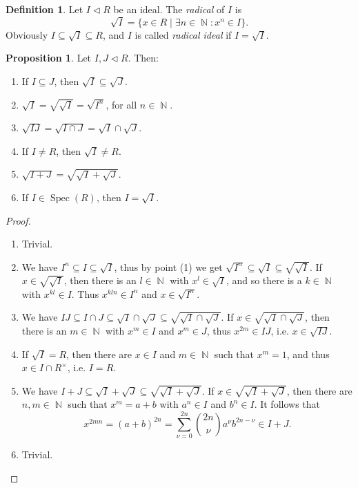 \documentclass[12pt,a4paper]{report}
\theoremstyle{definition}
\newtheorem{proposition}[theorem]{Proposition}
\newtheorem{defn}[theorem]{Definition}
\theoremstyle{num.custom-title}
\DeclareMathOperator{\N}{\mathbb{N}}
\DeclareMathOperator{\sse}{\subseteq}
\DeclareMathOperator{\Spec}{Spec}
\begin{document}
\begin{defn}
Let $I \lhd R$ be an ideal. The \emph{radical} of $I$ is
\[
\sqrt{I} = \{ x \in R \mid \exists n \in \N \colon x^n \in I \}.
\]
Obviously $I \sse \sqrt{I} \sse R$, and $I$ is called \emph{radical ideal} if $I=\sqrt{I}$.
\end{defn}

\begin{proposition}
Let $I,J \lhd R$. Then:
\begin{enumerate}
\item If $I \sse J$, then $\sqrt{I} \sse \sqrt{J}$.
\item $\sqrt{I} = \sqrt{\sqrt{I}} = \sqrt{I^n}$, for all $n \in \N$.
\item $\sqrt{IJ} = \sqrt{I \cap J} = \sqrt{I} \cap \sqrt{J}$.
\item If $I \neq R$, then $\sqrt{I} \neq R$.
\item $\sqrt{I +J} = \sqrt{\sqrt{I}+\sqrt{J}}$.
\item If $I \in \Spec(R)$, then $I = \sqrt{I}$.
\end{enumerate}
\begin{proof}\ 
\begin{enumerate}
\item Trivial.
\item We have $I^n \sse I \sse \sqrt{I}$, thus by point (1) we get $\sqrt{I^n} \sse \sqrt{I} \sse \sqrt{\sqrt{I}}$. If $x \in \sqrt{\sqrt{I}}$, then there is an $l \in \N$ with $x^l \in \sqrt{I}$, and so there is a $k \in \N$ with $x^{kl} \in I$. Thus $x^{kln} \in I^n$ and $x \in \sqrt{I^n}$.
\item We have $IJ \sse I \cap J \sse \sqrt{I} \cap \sqrt{J} \sse \sqrt{\sqrt{I} \cap \sqrt{J}}$. If $x \in \sqrt{\sqrt{I} \cap \sqrt{J}}$, then there is an $m \in \N$ with $x^m \in I$ and $x^m \in J$, thus $x^{2m} \in IJ$, i.e. $x \in \sqrt{IJ}$.
\item If $\sqrt{I} = R$, then there are $x \in I$ and $m \in \N$ such that $x^m = 1$, and thus $x \in I \cap R^\times$, i.e. $I=R$.
\item We have $I+J \sse \sqrt{I} + \sqrt{J} \sse \sqrt{\sqrt{I}+\sqrt{J}}$. If $x \in \sqrt{\sqrt{I}+\sqrt{J}}$, then there are $n,m \in \N$ such that $x^m = a+b$ with $a^n \in I$ and $b^n \in I$. It follows that
\[
x^{2mn} = (a+b)^{2n} = \sum_{\nu=0}^{2n} \binom{2n}{\nu} a^\nu b^{2n-\nu} \in I+J.
\]
\item Trivial.
\end{enumerate}
\end{proof}
\end{proposition}
\end{document}
